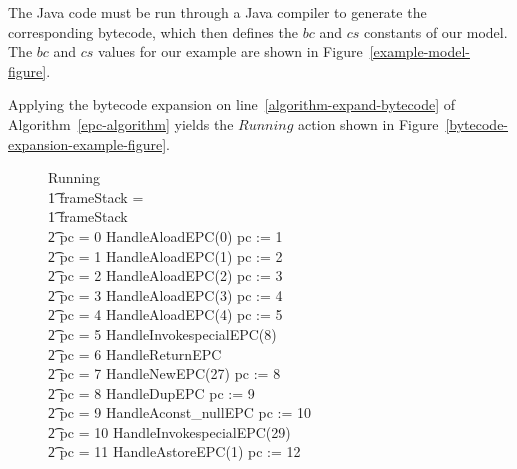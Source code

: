 The Java code must be run through a Java compiler to generate the
corresponding bytecode, which then defines the $bc$ and $cs$ constants
of our model.
The $bc$ and $cs$ values for our example are shown in
Figure~\ref{example-model-figure}.


Applying the bytecode expansion on
line~\ref{algorithm-expand-bytecode} of Algorithm~\ref{epc-algorithm}
yields the $Running$ action shown in
Figure~\ref{bytecode-expansion-example-figure}.
\begin{figure}[t]
  \setlength{\zedindent}{0cm}
  \setlength{\zedtab}{0.3cm}
  \setlength{\zedleftsep}{0.1cm}
  \begin{circus}
    Running \circdef \\
    \t1 \circif frameStack = \emptyset \circthen \Skip \\
    \t1 {} \circelse frameStack \neq \emptyset \circthen {} \\
    \t2 \circif pc = 0 \circthen HandleAloadEPC(0) \circseq pc := 1 \\
    \t2 {} \circelse pc = 1 \circthen HandleAloadEPC(1) \circseq pc := 2 \\
    \t2 {} \circelse pc = 2 \circthen HandleAloadEPC(2) \circseq pc := 3 \\
    \t2 {} \circelse pc = 3 \circthen HandleAloadEPC(3) \circseq pc := 4 \\
    \t2 {} \circelse pc = 4 \circthen HandleAloadEPC(4) \circseq pc := 5 \\
    \t2 {} \circelse pc = 5 \circthen HandleInvokespecialEPC(8) \\
    \t2 {} \circelse pc = 6 \circthen HandleReturnEPC \\
    \t2 {} \circelse pc = 7 \circthen HandleNewEPC(27) \circseq pc := 8 \\
    \t2 {} \circelse pc = 8 \circthen HandleDupEPC \circseq pc := 9 \\
    \t2 {} \circelse pc = 9 \circthen HandleAconst\_nullEPC \circseq pc := 10 \\
    \t2 {} \circelse pc = 10 \circthen HandleInvokespecialEPC(29) \\
    \t2 {} \circelse pc = 11 \circthen HandleAstoreEPC(1) \circseq pc := 12 \\

\end{circus}
\end{figure}
